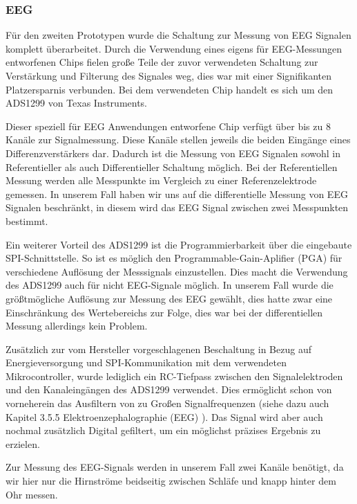 \subsubsection{EEG} \label{eeg-subsubsec}

Für den zweiten Prototypen wurde die Schaltung zur Messung von EEG Signalen komplett überarbeitet. Durch die Verwendung eines eigens für EEG-Messungen entworfenen Chips fielen große Teile der zuvor verwendeten Schaltung zur Verstärkung und Filterung des Signales weg, dies war mit einer Signifikanten Platzersparnis verbunden. Bei dem verwendeten Chip handelt es sich um den ADS1299 von Texas Instruments. 

Dieser speziell für EEG Anwendungen entworfene Chip verfügt über bis zu 8 Kanäle zur Signalmessung. Diese Kanäle stellen jeweils die beiden Eingänge eines Differenzverstärkers dar. Dadurch ist die Messung von EEG Signalen sowohl in Referentieller als auch Differentieller Schaltung möglich. Bei der Referentiellen Messung werden alle Messpunkte im Vergleich zu einer Referenzelektrode gemessen. In unserem Fall haben wir uns auf die differentielle Messung von EEG Signalen beschränkt, in diesem wird das EEG Signal zwischen zwei Messpunkten bestimmt. 

Ein weiterer Vorteil des ADS1299 ist die Programmierbarkeit über die eingebaute SPI-Schnittstelle. So ist es möglich den Programmable-Gain-Aplifier (PGA) für verschiedene Auflösung der Messsignals einzustellen. Dies macht die Verwendung des ADS1299 auch für nicht EEG-Signale möglich. In unserem Fall wurde die größtmögliche Auflösung zur Messung des EEG gewählt, dies hatte zwar eine Einschränkung des Wertebereichs zur Folge, dies war bei der differentiellen Messung allerdings kein Problem.

Zusätzlich zur vom Hersteller vorgeschlagenen Beschaltung in Bezug auf Energieversorgung und SPI-Kommunikation mit dem verwendeten Mikrocontroller, wurde lediglich ein RC-Tiefpass zwischen den Signalelektroden und den Kanaleingängen des ADS1299 verwendet. Dies ermöglicht schon von vorneherein das Ausfiltern von zu Großen Signalfrequenzen (siehe dazu auch Kapitel 3.5.5 Elektroenzephalographie (EEG) ). Das Signal wird aber auch nochmal zusätzlich Digital gefiltert, um ein möglichst präzises Ergebnis zu erzielen.

Zur Messung des EEG-Signals werden in unserem Fall zwei Kanäle benötigt, da wir hier nur die Hirnströme beidseitig zwischen Schläfe und knapp hinter dem Ohr messen.




